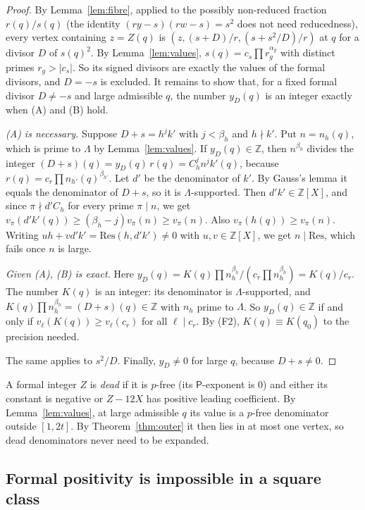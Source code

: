 \documentclass[11pt,reqno]{amsart}
\theoremstyle{definition}
\newcommand{\Z}{\mathbb Z}
\newcommand{\Pp}{\mathsf P}
\begin{document}
\begin{proof}
By Lemma~\ref{lem:fibre}, applied to the possibly non-reduced fraction
$r(q)/s(q)$ (the identity $(ry-s)(rw-s)=s^2$ does not need
reducedness), every vertex containing $z=Z(q)$ is
$(z,(s+D)/r,(s+s^2/D)/r)$ at $q$ for a divisor $D$ of $s(q)^2$.  By
Lemma~\ref{lem:values}, $s(q)=c_s\prod r_g^{\alpha_g}$ with distinct
primes $r_g>|c_s|$.  So its signed divisors are exactly the values of the
formal divisors, and $D=-s$ is excluded.  It remains to show that, for a
fixed formal divisor $D\ne-s$ and large admissible $q$, the number
$y_D(q)$ is an integer exactly when (A) and (B) hold.

\emph{(A) is necessary.}  Suppose $D+s=h^jk'$ with $j<\beta_h$ and
$h\nmid k'$.  Put $n=n_h(q)$, which is prime to $\Lambda$ by
Lemma~\ref{lem:values}.  If $y_D(q)\in\Z$, then $n^{\beta_h}$ divides the
integer $(D+s)(q)=y_D(q)\,r(q)=C_h^jn^jk'(q)$, because $r(q)=c_r\prod
n_{h'}(q)^{\beta_{h'}}$.  Let $d'$ be the denominator of $k'$.  By Gauss's
lemma it equals the denominator of $D+s$, so it is $\Lambda$-supported.
Then $d'k'\in\Z[X]$, and since $\pi\nmid d'C_h$ for every prime
$\pi\mid n$, we get $v_\pi(d'k'(q))\ge(\beta_h-j)v_\pi(n)\ge v_\pi(n)$.  Also
$v_\pi(h(q))\ge v_\pi(n)$.  Writing $uh+vd'k'=\mathrm{Res}(h,d'k')\ne0$ with
$u,v\in\Z[X]$, we get $n\mid\mathrm{Res}$, which fails once $n$ is large.

\emph{Given (A), (B) is exact.}  Here
$y_D(q)=K(q)\prod n_h^{\beta_h}/(c_r\prod n_h^{\beta_h})=K(q)/c_r$.  The
number $K(q)$ is an integer: its denominator is $\Lambda$-supported, and
$K(q)\prod n_h^{\beta_h}=(D+s)(q)\in\Z$ with $n_h$ prime to $\Lambda$.  So
$y_D(q)\in\Z$ if and only if $v_\ell(K(q))\ge v_\ell(c_r)$ for all
$\ell\mid c_r$.  By (F2), $K(q)\equiv K(q_0)$ to the precision needed.

The same applies to $s^2/D$.  Finally, $y_D\ne0$ for large $q$, because
$D+s\ne0$.
\end{proof}

A formal integer $Z$ is \emph{dead} if it is $p$-free (its $\Pp$-exponent
is $0$) and either its constant is negative or $Z-12X$ has positive leading
coefficient.  By Lemma~\ref{lem:values}, at large admissible $q$ its value is
a $p$-free denominator outside $[1,2t]$.  By Theorem~\ref{thm:outer} it then
lies in at most one vertex, so dead denominators never need to be expanded.

\subsection{Formal positivity is impossible in a square class}
\end{document}

